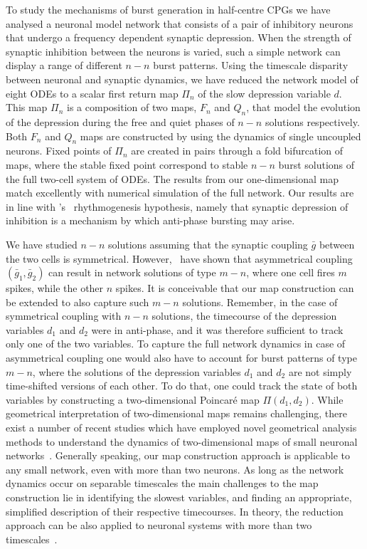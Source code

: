 \documentclass[utf8,draft]{frontiersFPHY} %
\newcommand{\gbar}{\bar g}
\begin{document}
To study the mechanisms of burst generation in half-centre CPGs we have analysed a neuronal model network that consists of a pair of inhibitory neurons that undergo a frequency dependent synaptic depression.
When the strength of synaptic inhibition between the neurons is varied, such a simple network can display a range of different $n-n$ burst patterns.
Using the timescale disparity between neuronal and synaptic dynamics, we have reduced the network model of eight ODEs to a scalar first return map $\Pi_n$ of the slow depression variable $d$.
This map $\Pi_n$ is a composition of two maps, $F_n$ and $Q_n$, that model the evolution of the depression during the free and quiet phases of $n-n$ solutions respectively.
Both $F_n$ and $Q_n$ maps are constructed by using the dynamics of single uncoupled neurons.
Fixed points of $\Pi_n$ are created in pairs through a fold bifurcation of maps, where the stable fixed point correspond to stable $n-n$ burst solutions of the full two-cell system of ODEs.
The results from our one-dimensional map match excellently with numerical simulation of the full network.
Our results are in line with \citeauthor{brown1911}'s~\citeyear{brown1911} rhythmogenesis hypothesis, namely that synaptic depression of inhibition is a mechanism by which anti-phase bursting may arise.

We have studied $n-n$ solutions assuming that the synaptic coupling $\gbar $ between the two cells is symmetrical.
However,~\citet{bose2011} have shown that asymmetrical coupling $(\gbar_1, \gbar_2)$ can result in network solutions of type $m-n$, where one cell fires $m$ spikes, while the other $n$ spikes.
It is conceivable that our map construction can be extended to also capture such $m-n$ solutions.
Remember, in the case of symmetrical coupling with $n-n$ solutions, the timecourse of the depression variables $d_{1}$ and $d_{2}$ were in anti-phase, and it was therefore sufficient to track only one of the two variables.
To capture the full network dynamics in case of asymmetrical coupling one would also have to account for burst patterns of type $m-n$, where the solutions of the depression variables $d_1$ and $d_2$ are not simply time-shifted versions of each other.
To do that, one could track the state of both variables by constructing a two-dimensional Poincaré map $\Pi(d_1,d_2)$.
While geometrical interpretation of two-dimensional maps remains challenging, there exist a number of recent studies which have employed novel geometrical analysis methods to understand the dynamics of two-dimensional maps of small neuronal networks~\citep{akcay2014,akcay2018,liao2020}.
Generally speaking, our map construction approach is applicable to any small network, even with more than two neurons.
As long as the network dynamics occur on separable timescales the main challenges to the map construction lie in identifying the slowest variables, and finding an appropriate, simplified description of their respective timecourses. 
In theory, the reduction approach can be also applied to neuronal systems with more than two timescales~\citep[e.g. see][]{kuehn2015}.
\end{document}

